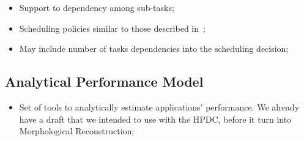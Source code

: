 \begin{itemize}
	\item Support to dependency among sub-tasks;

	\item Scheduling policies similar to those described in~\cite{Teodoro-IPDPS2012};

	\item May include number of tasks dependencies into the scheduling decision;

\end{itemize}


\subsection{Analytical Performance Model}

\begin{itemize}

	\item Set of tools to analytically estimate applications' performance.
We already have a draft that we intended to use with the HPDC, before it turn
into Morphological Reconstruction;

\end{itemize}

